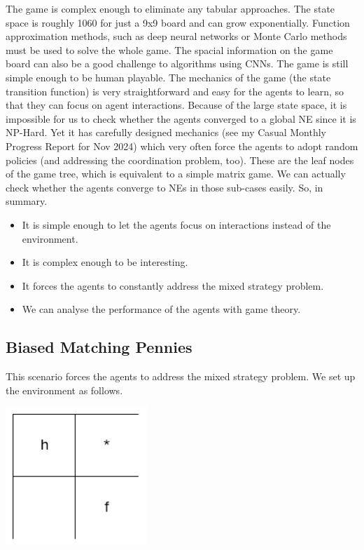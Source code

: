 \documentclass[a4paper]{article}
\begin{document}
\begin{multicols}{2}
The game is complex enough to eliminate any tabular approaches. The state space is roughly 1060 for just a 9x9 board and can grow exponentially. Function approximation methods, such as deep neural networks or Monte Carlo methods must be used to solve the whole game. The spacial information on the game board can also be a good challenge to algorithms using CNNs. The game is still simple enough to be human playable. The mechanics of the game (the state transition function) is very straightforward and easy for the agents to learn, so that they can focus on agent interactions. Because of the large state space, it is impossible for us to check whether the agents converged to a global NE since it is NP-Hard. Yet it has carefully designed mechanics (see my Casual Monthly Progress Report for Nov 2024) which very often force the agents to adopt random policies (and addressing the coordination problem, too). These are the leaf nodes of the game tree, which is equivalent to a simple matrix game. We can actually check whether the agents converge to NEs in those sub-cases easily. So, in summary.

\begin{itemize}
    \item It is simple enough to let the agents focus on interactions instead of the environment.
    \item It is complex enough to be interesting.
    \item It forces the agents to constantly address the mixed strategy problem.
    \item We can analyse the performance of the agents with game theory.
\end{itemize}

\subsection{Biased Matching Pennies}
This scenario forces the agents to address the mixed strategy problem. We set up the environment as follows.

\noindent
\begin{minipage}{\columnwidth}
\centering
\includegraphics[width=0.4\textwidth]{images/biased_matching_pennies.png}
\label{fig:biased_matching_pennies}
\end{minipage}


\end{multicols}
\end{document}
